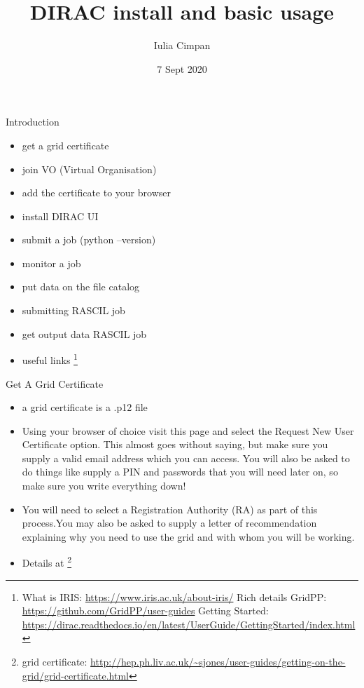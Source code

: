 \documentclass{beamer}
\title[IRIS]{DIRAC install and basic usage}
\author{Iulia Cimpan}
\institute{UoM}
\date{7 Sept 2020}
\begin{document}
\begin{frame}
  \titlepage
\end{frame}




\begin{frame}{Introduction}
\begin{center}
\begin{itemize}
  \item get a grid certificate
\item join VO (Virtual Organisation)
\item add the certificate to your browser
\item install DIRAC UI
\item submit a job (python --version)
\item monitor a job
\item put data on the file catalog
\item submitting RASCIL job
\item get output data RASCIL job 
\item useful links
\footnote{What is IRIS: \url{https://www.iris.ac.uk/about-iris/} \newline
 Rich details GridPP:
\url{https://github.com/GridPP/user-guides} \newline
Getting Started:
\url{https://dirac.readthedocs.io/en/latest/UserGuide/GettingStarted/index.html}}
\end{itemize}
\end{center}
\end{frame}




\begin{frame}{Get A Grid Certificate}
\begin{center}
    \begin{itemize}
 \item a grid certificate is a .p12 file 
\item Using your browser of choice visit this page and select the Request New User Certificate option. This almost goes without saying, but make sure you supply a valid email address which you can access. You will also be asked to do things like supply a PIN and passwords that you will need later on, so make sure you write everything down!
\item You will need to select a Registration Authority (RA) as part of this process.You may also be asked to supply a letter of recommendation explaining why you need to use the grid and with whom you will be working.
\item Details at \footnote{grid certificate: \url{http://hep.ph.liv.ac.uk/~sjones/user-guides/getting-on-the-grid/grid-certificate.html}}
\end{itemize}
\end{center}
\end{frame}
\end{document}
